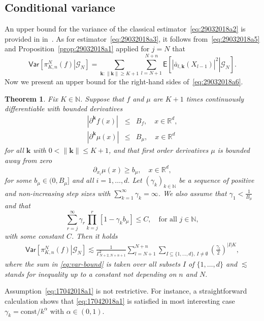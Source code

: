 \documentclass[article]{elsarticle}
\newtheorem{thm}{Theorem}
\newcommand*{\const}{\mathrm{const}}
\begin{document}
\subsection{Conditional variance}
An upper bound for the variance of the classical estimator~\eqref{eq:29032018a2}
is provided in  in~\cite[Theorem~17]{durmus:moulines:2017}.
As for estimator~\eqref{eq:29032018a3},
it follows from~\eqref{eq:29032018a5}
and Proposition~\ref{prop:29032018a1}
applied for $j=N$ that
\begin{equation}\label{eq:29032018a6}
\mathsf{Var}\left[\left.\pi_{K,n}^{N}(f)\right|\mathcal G_N\right]
=\sum_{\mathbf k\colon \|\mathbf k\|\ge K+1}
\sum_{l=N+1}^{N+n}
\mathsf{E}\left[\left.\left|\bar a_{l,\mathbf{k}}(X_{l-1})\right|^{2}
\right|\mathcal G_N\right].
\end{equation}
Now we present an upper bound for the right-hand sides of~\eqref{eq:29032018a6}.
\begin{thm}\label{th:mr}
Fix $K\in\mathbb N$.
Suppose that $f$  and \(\mu\) are \(K+1\) times continuously differentiable
with bounded derivatives
\begin{eqnarray*}
|\partial^{\mathbf{k}} f(x)|&\le & B_f,\quad
x\in\mathbb R^d,
\\
|\partial^{\mathbf{k}}\mu(x)|&\le & B_\mu,\quad
x\in\mathbb R^d
\end{eqnarray*}
for all \(\mathbf{k}\) with \(0<\|\mathbf{k}\|\leq  K+1\),
and that first order derivatives $\mu$ is bounded away from zero
$$
\partial_{x_i}\mu(x)\ge b_\mu,\quad x\in\mathbb R^d,
$$
for some $b_\mu\in(0,B_\mu]$ and all \(i=1,\ldots, d.\)
Let $(\gamma_k)_{k\in\mathbb N}$ be a sequence of positive
and non-increasing step sizes with $\sum_{k=1}^\infty \gamma_k=\infty$.
We also assume that $\gamma_1<\frac1{B_\mu}$ and that
\begin{equation}\label{eq:17042018a1}
\sum_{r=j}^\infty \gamma_r\prod_{k=j}^{r}\left[1-\gamma_{k}b_\mu\right]\leq C,\quad\text{for all }j\in\mathbb N,
\end{equation}
with some constant \(C\). Then it holds
\begin{eqnarray}
\label{eq:var-bound}
\mathsf{Var}\left[\left.\pi_{K,n}^{N}(f)\right|\mathcal G_N\right]\lesssim \frac{1}{\Gamma^2_{N+2,N+n+1}}\sum_{l=N+1}^{N+n}\sum_{I\subseteq\{1,\ldots,d\},\, I\neq \emptyset}
\left(\frac{\gamma_{l}}{2}\right)^{|I|K},
\end{eqnarray}
where the sum in \eqref{eq:var-bound} is taken over all subsets \(I\) of \(\{1,\ldots,d\}\) and \(\lesssim\) stands for inequality up to a constant not depending  on \(n\) and \(N.\)
\end{thm}
\begin{remark}
Assumption~\eqref{eq:17042018a1} is not restrictive.
For instance, a straightforward calculation shows
that \eqref{eq:17042018a1} is satisfied in most interesting case
$\gamma_k=\const/k^\alpha$ with $\alpha\in (0,1)$.
\end{remark}
\end{document}

